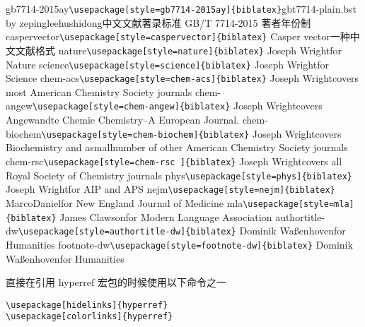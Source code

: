 gb7714-2015ay\textbar{}\texttt{\textbackslash{}usepackage{[}style=gb7714-2015ay{]}\{biblatex\}}\textbar{}gbt7714-plain.bst
by zepinglee\textbar{}hushidong\textbar{}中文文献著录标准 GB/T 7714-2015
著者年份制\textbar{}
caspervector\textbar{}\texttt{\textbackslash{}usepackage{[}style=caspervector{]}\{biblatex\}}\textbar{}
\textbar{}Casper vector\textbar{}一种中文文献格式\textbar{}
nature\textbar{}\texttt{\textbackslash{}usepackage{[}style=nature{]}\{biblatex\}}\textbar{}
\textbar{}Joseph Wright\textbar{}for Nature\textbar{}
science\textbar{}\texttt{\textbackslash{}usepackage{[}style=science{]}\{biblatex\}}\textbar{}
\textbar{}Joseph Wright\textbar{}for Science\textbar{}
chem-acs\textbar{}\texttt{\textbackslash{}usepackage{[}style=chem-acs{]}\{biblatex\}}\textbar{}
\textbar{}Joseph Wright\textbar{}covers most American Chemistry Society
journals\textbar{}
chem-angew\textbar{}\texttt{\textbackslash{}usepackage{[}style=chem-angew{]}\{biblatex\}}\textbar{}
\textbar{}Joseph Wright\textbar{}covers Angewandte Chemie Chemistry--A
European Journal.\textbar{}
chem-biochem\textbar{}\texttt{\textbackslash{}usepackage{[}style=chem-biochem{]}\{biblatex\}}\textbar{}
\textbar{}Joseph Wright\textbar{}covers Biochemistry and asmallnumber of
other American Chemistry Society journals\textbar{}
chem-rsc\textbar{}\texttt{\textbackslash{}usepackage{[}style=chem-rsc\ {]}\{biblatex\}}\textbar{}
\textbar{}Joseph Wright\textbar{}covers all Royal Society of Chemistry
journals\textbar{}
phys\textbar{}\texttt{\textbackslash{}usepackage{[}style=phys{]}\{biblatex\}}\textbar{}
\textbar{}Joseph Wright\textbar{}for AIP and APS\textbar{}
nejm\textbar{}\texttt{\textbackslash{}usepackage{[}style=nejm{]}\{biblatex\}}\textbar{}
\textbar{}MarcoDaniel\textbar{}for New England Journal of
Medicine\textbar{}
mla\textbar{}\texttt{\textbackslash{}usepackage{[}style=mla{]}\{biblatex\}}\textbar{}
\textbar{}James Clawson\textbar{}for Modern Language
Association\textbar{}
authortitle-dw\textbar{}\texttt{\textbackslash{}usepackage{[}style=authortitle-dw{]}\{biblatex\}}\textbar{}
\textbar{}Dominik Waßenhoven\textbar{}for Humanities\textbar{}
footnote-dw\textbar{}\texttt{\textbackslash{}usepackage{[}style=footnote-dw{]}\{biblatex\}}\textbar{}
\textbar{}Dominik Waßenhoven\textbar{}for Humanities\textbar{}



直接在引用 hyperref 宏包的时候使用以下命令之一

\begin{verbatim}
\usepackage[hidelinks]{hyperref}
\usepackage[colorlinks]{hyperref}
\end{verbatim}

